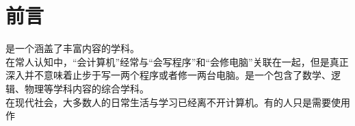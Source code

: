 \chapter*{前言}\label{ch:preface}
    \cst 是一个涵盖了丰富内容的学科。\\
    在常人认知中，“会计算机”经常与“会写程序”和“会修电脑”关联在一起，但是真正深入\cst 并不意味着止步于写一两个程序或者修一两台电脑。\cst 是一个包含了数学、逻辑、物理等学科内容的综合学科。\\
    在现代社会，大多数人的日常生活与学习已经离不开计算机。有的人只是需要使用作
